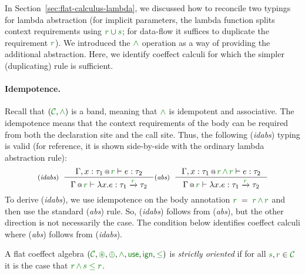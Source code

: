 In Section~\ref{sec:flat-calculus-lambda}, we discussed how to reconcile two typings for
lambda abstraction (for implicit parameters, the lambda function splits context requirements
using $\cclrd{r} \cup \cclrd{s}$; for data-flow it suffices to duplicate the requirement 
$\cclrd{r}$). We introduced the $\czip$ operation as a way of providing the additional abstraction.
Here, we identify coeffect calculi for which the simpler (duplicating) rule is sufficient.

\paragraph{Idempotence.}
Recall that $(\C, \czip)$ is a band, meaning that $\czip$  is idempotent and associative. The 
idempotence means that the context requirements of the body can be required from both the 
declaration site and the call site. Thus, the following (\emph{idabs}) typing is valid 
(for reference, it is shown side-by-side with the ordinary lambda abstraction rule):
%
\begin{equation*}
\tyrule{idabs}
  {\coctx{\Gamma, x:\tau_1}{\cclrd{r}} \vdash e : \tau_2}
  {\coctx{\Gamma}{\cclrd{r}} \vdash \lambda x.e : \tau_1 \xrightarrow{\cclrd{r}} \tau_2 }
\tyrule{abs}
  {\coctx{\Gamma, x:\tau_1}{\cclrd{r}\,\czip\,\cclrd{r}} \vdash e : \tau_2}
  {\coctx{\Gamma}{\cclrd{r}} \vdash \lambda x.e : \tau_1 \xrightarrow{\cclrd{r}} \tau_2 }
\end{equation*}
% 
To derive (\emph{idabs}), we use idempotence on the body annotation $\cclrd{r}\;=\;\cclrd{r}\,\czip\,\cclrd{r}$
and then use the standard (\emph{abs}) rule. So, (\emph{idabs}) follows from (\emph{abs}), 
but the other direction is not necessarily the case. The condition below identifies 
coeffect calculi where (\emph{abs}) follows from (\emph{idabs}).

\begin{definition}
A flat coeffect algebra $(\C, \cseq, \cpar, \czip, \cunit, \czero, \cleq)$ is \emph{strictly oriented} if for all
$\cclrd{s}, \cclrd{r} \in \C$ it is the case that $\cclrd{r} \,\czip\, \cclrd{s} \;\cleq\; \cclrd{r}$.
\end{definition}

